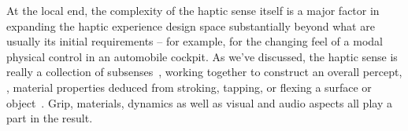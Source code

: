 
At the local end, the complexity of the haptic sense itself is a major factor in expanding the haptic experience design space substantially beyond what are usually its initial requirements -- for example, for the changing feel of a modal physical control in an automobile cockpit.
%
As we've discussed, 
the haptic sense is really a collection of subsenses~\citep{Kandel2000,ChoiKuchenbecker2013}, working together to construct an overall percept, \eg, material properties deduced from stroking, tapping, or flexing a surface or object~\citep{Lederman1987}.
Grip, materials, dynamics as well as visual and audio aspects all play a part in the result.
%
\begin{quote}
\end{quote}

